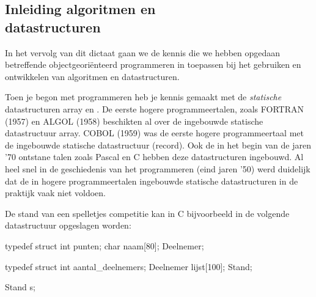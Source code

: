 \begin{cpplstShortInline}
\chapter[Inleiding algoritmen en datastructuren]{Inleiding algoritmen en \\datastructuren}
In het vervolg van dit dictaat gaan we de kennis die we hebben opgedaan betreffende objectgeoriënteerd programmeren in \Cpp{} toepassen bij het gebruiken en ontwikkelen van algoritmen en datastructuren. 

Toen je begon met programmeren heb je kennis gemaakt met de \emph{statische} datastructuren array en .
De eerste hogere programmeertalen, zoals FORTRAN (1957) en ALGOL (1958) beschikten al over de ingebouwde statische datastructuur array.
COBOL (1959) was de eerste hogere programmeertaal met de ingebouwde statische datastructuur  (record).
Ook de in het begin van de jaren '70 ontstane talen zoals Pascal en C hebben deze datastructuren ingebouwd.
Al heel snel in de geschiedenis van het programmeren (eind jaren '50) werd duidelijk dat de in hogere programmeertalen ingebouwde statische datastructuren in de praktijk vaak niet voldoen.

De stand van een spelletjes competitie kan in C bijvoorbeeld in de volgende datastructuur opgeslagen worden:
\begin{cpplstfragment}[style=cstyle]
typedef struct {
	int punten;
	char naam[80];
} Deelnemer;

typedef struct {
	int aantal_deelnemers;
	Deelnemer lijst[100];
} Stand;

Stand s;
\end{cpplstfragment}


\end{cpplstShortInline}
